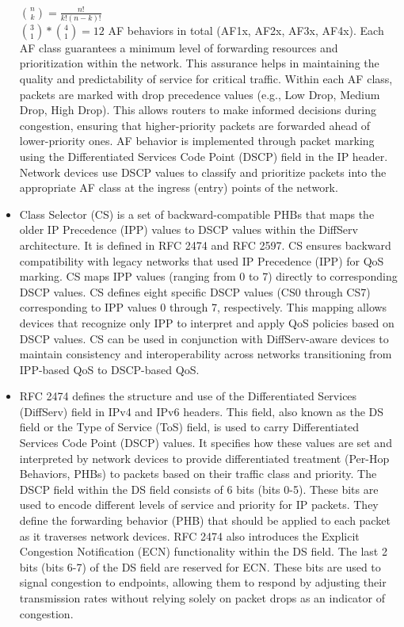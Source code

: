 \documentclass{article}
\begin{document}
\begin{itemize}
	$\binom{n}{k} = \frac{n!}{k!(n-k)!}$\\
	$\binom{3}{1} * \binom{4}{1} = 12$ AF behaviors in total (AF1x, AF2x, AF3x, AF4x). Each AF class guarantees a minimum level of forwarding resources and prioritization within the network. This assurance helps in maintaining the quality and predictability of service for critical traffic. Within each AF class, packets are marked with drop precedence values (e.g., Low Drop, Medium Drop, High Drop). This allows routers to make informed decisions during congestion, ensuring that higher-priority packets are forwarded ahead of lower-priority ones. AF behavior is implemented through packet marking using the Differentiated Services Code Point (DSCP) field in the IP header. Network devices use DSCP values to classify and prioritize packets into the appropriate AF class at the ingress (entry) points of the network.
	\item[] Class Selector (CS) is a set of backward-compatible PHBs that maps the older IP Precedence (IPP) values to DSCP values within the DiffServ architecture. It is defined in RFC 2474 and RFC 2597. CS ensures backward compatibility with legacy networks that used IP Precedence (IPP) for QoS marking. CS maps IPP values (ranging from 0 to 7) directly to corresponding DSCP values. CS defines eight specific DSCP values (CS0 through CS7) corresponding to IPP values 0 through 7, respectively. This mapping allows devices that recognize only IPP to interpret and apply QoS policies based on DSCP values. CS can be used in conjunction with DiffServ-aware devices to maintain consistency and interoperability across networks transitioning from IPP-based QoS to DSCP-based QoS.
	\item[] RFC 2474 defines the structure and use of the Differentiated Services (DiffServ) field in IPv4 and IPv6 headers. This field, also known as the DS field or the Type of Service (ToS) field, is used to carry Differentiated Services Code Point (DSCP) values. It specifies how these values are set and interpreted by network devices to provide differentiated treatment (Per-Hop Behaviors, PHBs) to packets based on their traffic class and priority. The DSCP field within the DS field consists of 6 bits (bits 0-5). These bits are used to encode different levels of service and priority for IP packets. They define the forwarding behavior (PHB) that should be applied to each packet as it traverses network devices. RFC 2474 also introduces the Explicit Congestion Notification (ECN) functionality within the DS field. The last 2 bits (bits 6-7) of the DS field are reserved for ECN. These bits are used to signal congestion to endpoints, allowing them to respond by adjusting their transmission rates without relying solely on packet drops as an indicator of congestion.

\end{itemize}
\end{document}
